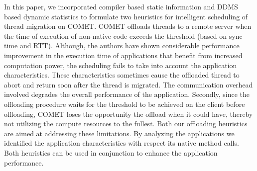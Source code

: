 In this paper, we incorporated compiler based static information and DDMS based dynamic statistics to formulate two heuristics for intelligent scheduling of thread migration on COMET. COMET offloads threads to a remote server when the time of execution of non-native code exceeds the threshold (based on sync time and RTT). Although, the authors have shown considerable performance improvement in the execution time of applications that benefit from increased computation power, the scheduling fails to take into account the application characteristics. These characteristics sometimes cause the offloaded thread to abort and return soon after the thread is migrated. The communication overhead involved degrades the overall performance of the application. Secondly, since the offloading procedure waits for the threshold to be achieved on the client before offloading, COMET loses the opportunity the offload when it could have, thereby not utilizing the compute resources to the fullest.
Both our offloading heuristics are aimed at addressing these limitations. By analyzing the applications we identified the application characteristics with respect its native method calls. Both heuristics can be used in conjunction to enhance the application performance.
